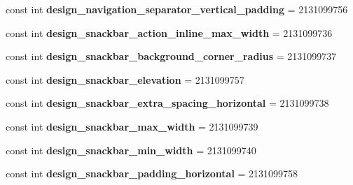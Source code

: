 \begin{DoxyCompactItemize}
const int {\bfseries design\+\_\+navigation\+\_\+separator\+\_\+vertical\+\_\+padding} = 2131099756
\item 
\mbox{\label{class_pinned_app_1_1_droid_1_1_resource_1_1_dimension_a80b15d319d4a3d125cf523f40bdf7488}} 
const int {\bfseries design\+\_\+snackbar\+\_\+action\+\_\+inline\+\_\+max\+\_\+width} = 2131099736
\item 
\mbox{\label{class_pinned_app_1_1_droid_1_1_resource_1_1_dimension_ad5bfb3932173a8d2860a91bf78d3436a}} 
const int {\bfseries design\+\_\+snackbar\+\_\+background\+\_\+corner\+\_\+radius} = 2131099737
\item 
\mbox{\label{class_pinned_app_1_1_droid_1_1_resource_1_1_dimension_a3db89f2fc7d1e3f05f7290cbdc6d1c57}} 
const int {\bfseries design\+\_\+snackbar\+\_\+elevation} = 2131099757
\item 
\mbox{\label{class_pinned_app_1_1_droid_1_1_resource_1_1_dimension_a50962894daa687223974ffe98820f634}} 
const int {\bfseries design\+\_\+snackbar\+\_\+extra\+\_\+spacing\+\_\+horizontal} = 2131099738
\item 
\mbox{\label{class_pinned_app_1_1_droid_1_1_resource_1_1_dimension_a7a0b0a2f3975951c9bf020ef299fe599}} 
const int {\bfseries design\+\_\+snackbar\+\_\+max\+\_\+width} = 2131099739
\item 
\mbox{\label{class_pinned_app_1_1_droid_1_1_resource_1_1_dimension_aa4f8b3b3c92ae893f277aff61c023188}} 
const int {\bfseries design\+\_\+snackbar\+\_\+min\+\_\+width} = 2131099740
\item 
\mbox{\label{class_pinned_app_1_1_droid_1_1_resource_1_1_dimension_ad5ad6878df25ed0cd1b8a5e48289df76}} 
const int {\bfseries design\+\_\+snackbar\+\_\+padding\+\_\+horizontal} = 2131099758
\item 
\mbox{\label{class_pinned_app_1_1_droid_1_1_resource_1_1_dimension_a2ef25d75f1f91f0ec60d48d7eeef51ed}} 

\end{DoxyCompactItemize}
